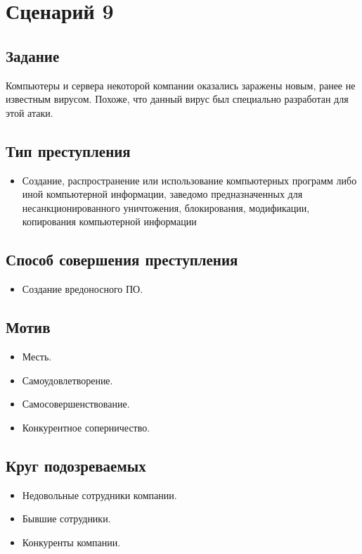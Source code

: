 \section*{Сценарий 9}

\subsection*{Задание}
Компьютеры и сервера некоторой компании оказались заражены новым, ранее не
известным вирусом. Похоже, что данный вирус был специально разработан для этой
атаки.

\subsection*{Тип преступления}
\begin{itemize}
  \item Создание, распространение или использование компьютерных программ либо
    иной компьютерной информации, заведомо предназначенных для
    несанкционированного уничтожения, блокирования, модификации, копирования
    компьютерной информации
\end{itemize}

\subsection*{Способ совершения преступления}
\begin{itemize}
  \item Создание вредоносного ПО.
\end{itemize}

\subsection*{Мотив}
\begin{itemize}
  \item Месть.
  \item Самоудовлетворение.
  \item Самосовершенствование.
  \item Конкурентное соперничество.
\end{itemize}

\subsection*{Круг подозреваемых}
\begin{itemize}
  \item Недовольные сотрудники компании.
  \item Бывшие сотрудники.
  \item Конкуренты компании.
\end{itemize}

